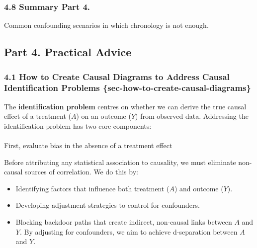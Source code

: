 \documentclass[
  single column]{article}
\makeatletter
\let\oldparagraph\paragraph
\renewcommand{\paragraph}{
    \@ifstar
      \xxxParagraphStar
      \xxxParagraphNoStar
  }
\newcommand{\xxxParagraphStar}[1]{\oldparagraph*{#1}\mbox{}}
\newcommand{\xxxParagraphNoStar}[1]{\oldparagraph{#1}\mbox{}}
\providecommand{\tightlist}{%
  \setlength{\itemsep}{0pt}\setlength{\parskip}{0pt}}\usepackage{longtable,booktabs,array}
\makeatother
\begin{document}
\subsubsection{4.8 Summary Part 4.}\label{summary-part-4.}

\begin{table}

\caption{\label{tbl-chronology-notenough}Common confounding scenarios in
which chronology is not enough.}

\centering{

\terminologychronologicalhygeineNOTENOUGH

}

\end{table}%

\subsection{Part 4. Practical Advice}\label{part-4.-practical-advice}

\subsubsection{4.1 How to Create Causal Diagrams to Address Causal
Identification Problems
\{sec-how-to-create-causal-diagrams\}}\label{how-to-create-causal-diagrams-to-address-causal-identification-problems-sec-how-to-create-causal-diagrams}

The \textbf{identification problem} centres on whether we can derive the
true causal effect of a treatment (\(A\)) on an outcome (\(Y\)) from
observed data. Addressing the identification problem has two core
components:

\paragraph{First, evaluate bias in the absence of a treatment
effect}\label{first-evaluate-bias-in-the-absence-of-a-treatment-effect}

Before attributing any statistical association to causality, we must
eliminate non-causal sources of correlation. We do this by:

\begin{itemize}
\tightlist
\item
  Identifying factors that influence both treatment (\(A\)) and outcome
  (\(Y\)).
\item
  Developing adjustment strategies to control for confounders.
\item
  Blocking backdoor paths that create indirect, non-causal links between
  \(A\) and \(Y\). By adjusting for confounders, we aim to achieve
  d-separation between \(A\) and \(Y\).
\end{itemize}
\end{document}
